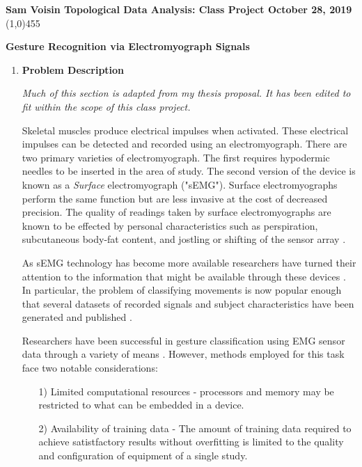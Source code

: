 \documentclass[11pt]{article}
\begin{document}
\noindent \textbf{Sam Voisin \hfill  \textbf{Topological Data Analysis: Class Project}  \hfill  October 28, 2019} \\
\line(1,0){455}

\begin{center}
\Large{{\bf Gesture Recognition via Electromyograph Signals}}\\
\end{center}

\begin{enumerate}
\setlength{\parindent}{5ex}

\item \textbf{Problem Description}

\noindent
\emph{Much of this section is adapted from my thesis proposal. It has been edited to fit within the scope of this class project.}

Skeletal muscles produce electrical impulses when activated. These electrical impulses can be detected and recorded using an electromyograph. There are two primary varieties of electromyograph. The first requires hypodermic needles to be inserted in the area of study. The second version of the device is known as a \emph{Surface} electromyograph ("sEMG"). Surface electromyographs perform the same function but are less invasive at the cost of decreased precision. The quality of readings taken by surface electromyographs are known to be effected by personal characteristics such as perspiration, subcutaneous body-fat content, and jostling or shifting of the sensor array \cite{lobov}.

As sEMG technology has become more available researchers have turned their attention to the information that might be available through these devices \cite{state}. In particular, the problem of classifying movements is now popular enough that several datasets of recorded signals and subject characteristics have been generated and published \cite{ninapro}.

Researchers have been successful in gesture classification using EMG sensor data through a variety of means \cite{state}. However, methods employed for this task face two notable considerations:
\begin{enumerate}
\item[1)] Limited computational resources - processors and memory may be restricted to what can be embedded in a device.
\item[2)] Availability of training data - The amount of training data required to achieve satistfactory results without overfitting is limited to  the quality and configuration of equipment of a single study. \cite{bigdata}
\end{enumerate}


\end{enumerate}
\end{document}
